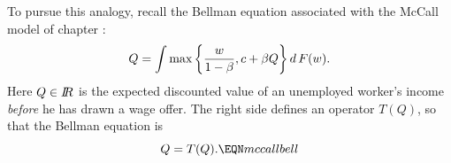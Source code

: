 

To pursue this analogy, recall the Bellman
equation associated with the  McCall model
of chapter :
$$ Q = \int  \max \left\{ {w \over 1 -\beta} , c + \beta Q \right\}
 d \, F(w). $$
Here $Q \in {\bbR}$  is the expected discounted value of an unemployed  worker's
income {\it before\/} he has drawn a wage offer.
The right side defines an operator $T(Q)$, so
that the Bellman equation is $$Q  = T(Q). \EQN mccallbell $$

